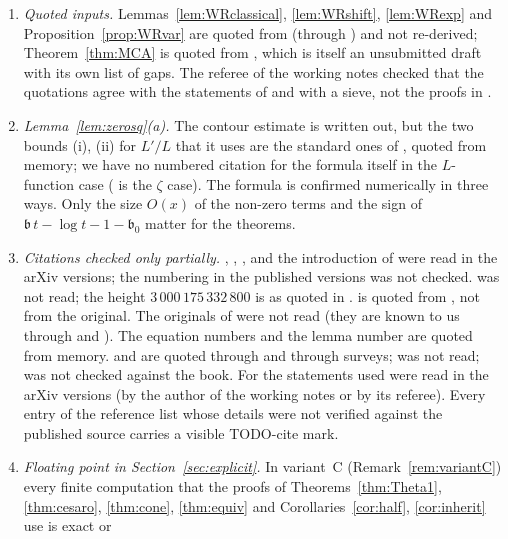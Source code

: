 \documentclass[11pt]{amsart}
\theoremstyle{definition}
\numberwithin{equation}{section}
\begin{document}
\begin{enumerate}
published statement.
\item \emph{Quoted inputs.} Lemmas~\ref{lem:WRclassical},
\ref{lem:WRshift}, \ref{lem:WRexp} and
Proposition~\ref{prop:WRvar} are quoted from \cite{WR} (through
\cite{MC}) and not re-derived; Theorem~\ref{thm:MCA} is quoted from
\cite{MC}, which is itself an unsubmitted draft with its own list of
gaps. The referee of the working notes checked that the quotations
agree with the statements of \cite{WR} and with a sieve, not the
proofs in \cite{WR}.
\item \emph{Lemma~\ref{lem:zerosq}(a).} The contour estimate is
written out, but the two bounds (i), (ii) for $L'/L$ that it uses are
the standard ones of \cite[Ch.~19]{Dav00}, quoted from memory; we
have no numbered citation for the formula itself in the $L$-function
case (\cite[Theorem~27]{Ing32} is the $\zeta$ case). The formula is
confirmed numerically in three ways. Only the size $O(x)$ of the
non-zero terms and the sign of
$\mathfrak b\,t-\log t-1-\mathfrak b_0$ matter for the theorems.
\item \emph{Citations checked only partially.}
\cite[Corollary~11.2 and Appendix~A.1.1]{BKLNW21},
\cite[Theorem~2]{But18}, \cite{Joh23}, \cite{Zhao25} and the
introduction of \cite{PT19} were read in the arXiv versions; the
numbering in the published versions was not checked. \cite{PT21} was
not read; the height $3\,000\,175\,332\,800$ is as quoted in
\cite{BKLNW21}. \cite[(3.15)--(3.16)]{RS62} is quoted from
\cite[Lemma~2.2]{Joh23}, not from the original. The originals of
\cite{HL18,Lan18,Pin91,Ing32} were not read (they are known to us
through \cite{PT19} and \cite{Joh23}). The equation numbers
\cite[Ch.~12, (17)--(18)]{Dav00} and the lemma number
\cite[Lemma~15.1]{MV07} are quoted from memory.
\cite[Theorem~1.2]{RS94} and \cite{Kac93} are quoted through
\cite{Dev20} and through surveys; \cite{BT15} was not read;
\cite[Theorem~6.9]{Vil09} was not checked against the book. For
\cite{Fio14,Dev20,Bai21,MN20,Pla16,PT26,Hay25} the statements used
were read in the arXiv versions (by the author of the working notes
or by its referee). Every entry of the reference list whose details
were not verified against the published source carries a visible
\textsf{TODO-cite} mark.
\item \emph{Floating point in Section~\ref{sec:explicit}.} In
variant~C (Remark~\ref{rem:variantC}) every finite computation that
the proofs of Theorems~\ref{thm:Theta1}, \ref{thm:cesaro},
\ref{thm:cone}, \ref{thm:equiv} and
Corollaries~\ref{cor:half}, \ref{cor:inherit} use is exact or

\end{enumerate}
\end{document}
